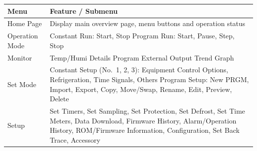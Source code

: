 \begin{longtable}[]{@{}ll@{}}
\toprule
\begin{minipage}[b]{0.26\columnwidth}\raggedright
Menu\strut
\end{minipage} & \begin{minipage}[b]{0.69\columnwidth}\raggedright
Feature / Submenu\strut
\end{minipage}\tabularnewline
\midrule
\endhead
\begin{minipage}[t]{0.26\columnwidth}\raggedright
Home Page\strut
\end{minipage} & \begin{minipage}[t]{0.69\columnwidth}\raggedright
Display main overview page, menu buttons and operation status\strut
\end{minipage}\tabularnewline
\begin{minipage}[t]{0.26\columnwidth}\raggedright
Operation Mode\strut
\end{minipage} & \begin{minipage}[t]{0.69\columnwidth}\raggedright
Constant Run: Start, Stop Program Run: Start, Pause, Step, Stop\strut
\end{minipage}\tabularnewline
\begin{minipage}[t]{0.26\columnwidth}\raggedright
Monitor\strut
\end{minipage} & \begin{minipage}[t]{0.69\columnwidth}\raggedright
Temp/Humi Details Program External Output Trend Graph\strut
\end{minipage}\tabularnewline
\begin{minipage}[t]{0.26\columnwidth}\raggedright
Set Mode\strut
\end{minipage} & \begin{minipage}[t]{0.69\columnwidth}\raggedright
Constant Setup (No.~1, 2, 3): Equipment Control Options, Refrigeration,
Time Signals, Others Program Setup: New PRGM, Import, Export, Copy,
Move/Swap, Rename, Edit, Preview, Delete\strut
\end{minipage}\tabularnewline
\begin{minipage}[t]{0.26\columnwidth}\raggedright
Setup\strut
\end{minipage} & \begin{minipage}[t]{0.69\columnwidth}\raggedright
Set Timers, Set Sampling, Set Protection, Set Defrost, Set Time Meters,
Data Download, Firmware History, Alarm/Operation History, ROM/Firmware
Information, Configuration, Set Back Trace, Accessory\strut
\end{minipage}\tabularnewline
\bottomrule
\end{longtable}

